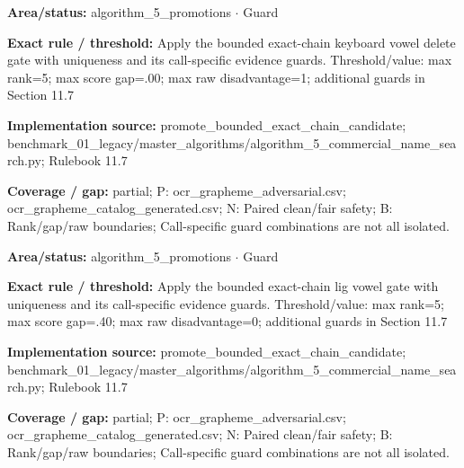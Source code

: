 \begin{tcolorbox}[enhanced,breakable,colback=white,colframe=Muted!45,boxrule=0.45pt,arc=1.5pt,left=6pt,right=6pt,top=5pt,bottom=5pt,title={\texttt{A5-CHAIN-KEYBOARD-VOWEL-DELETE}},title after break={\texttt{A5-CHAIN-KEYBOARD-VOWEL-DELETE}\ (continued)},fonttitle=\headingfont\bfseries\color{Navy},coltitle=Navy]
\textbf{Area/status:} algorithm\_\allowbreak{}5\_\allowbreak{}promotions $\boldsymbol{\cdot}$ Guard\par
\smallskip
\textbf{Exact rule / threshold:} Apply the bounded exact-chain keyboard vowel delete gate with uniqueness and its call-specific evidence guards. Threshold/\allowbreak{}value: max rank=5; max score gap=.00; max raw disadvantage=1; additional guards in Section 11.7\par
\smallskip
\textbf{Implementation source:} promote\_\allowbreak{}bounded\_\allowbreak{}exact\_\allowbreak{}chain\_\allowbreak{}candidate; benchmark\_\allowbreak{}01\_\allowbreak{}legacy/\allowbreak{}master\_\allowbreak{}algorithms/\allowbreak{}algorithm\_\allowbreak{}5\_\allowbreak{}commercial\_\allowbreak{}name\_\allowbreak{}search.py; Rulebook 11.7\par
\smallskip
\textbf{Coverage / gap:} partial; P: ocr\_\allowbreak{}grapheme\_\allowbreak{}adversarial.csv; ocr\_\allowbreak{}grapheme\_\allowbreak{}catalog\_\allowbreak{}generated.csv; N: Paired clean/\allowbreak{}fair safety; B: Rank/\allowbreak{}gap/\allowbreak{}raw boundaries; Call-specific guard combinations are not all isolated.
\end{tcolorbox}
\begin{tcolorbox}[enhanced,breakable,colback=white,colframe=Muted!45,boxrule=0.45pt,arc=1.5pt,left=6pt,right=6pt,top=5pt,bottom=5pt,title={\texttt{A5-CHAIN-LIG-VOWEL}},title after break={\texttt{A5-CHAIN-LIG-VOWEL}\ (continued)},fonttitle=\headingfont\bfseries\color{Navy},coltitle=Navy]
\textbf{Area/status:} algorithm\_\allowbreak{}5\_\allowbreak{}promotions $\boldsymbol{\cdot}$ Guard\par
\smallskip
\textbf{Exact rule / threshold:} Apply the bounded exact-chain lig vowel gate with uniqueness and its call-specific evidence guards. Threshold/\allowbreak{}value: max rank=5; max score gap=.40; max raw disadvantage=0; additional guards in Section 11.7\par
\smallskip
\textbf{Implementation source:} promote\_\allowbreak{}bounded\_\allowbreak{}exact\_\allowbreak{}chain\_\allowbreak{}candidate; benchmark\_\allowbreak{}01\_\allowbreak{}legacy/\allowbreak{}master\_\allowbreak{}algorithms/\allowbreak{}algorithm\_\allowbreak{}5\_\allowbreak{}commercial\_\allowbreak{}name\_\allowbreak{}search.py; Rulebook 11.7\par
\smallskip
\textbf{Coverage / gap:} partial; P: ocr\_\allowbreak{}grapheme\_\allowbreak{}adversarial.csv; ocr\_\allowbreak{}grapheme\_\allowbreak{}catalog\_\allowbreak{}generated.csv; N: Paired clean/\allowbreak{}fair safety; B: Rank/\allowbreak{}gap/\allowbreak{}raw boundaries; Call-specific guard combinations are not all isolated.
\end{tcolorbox}
